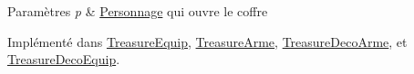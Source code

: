 \begin{DoxyParams}{Paramètres}
{\em p} & \hyperlink{class_personnage}{Personnage} qui ouvre le coffre \\
\hline
\end{DoxyParams}


Implémenté dans \hyperlink{class_treasure_equip_a187762eb0e25641cde7a2b15d94af4ed}{Treasure\-Equip}, \hyperlink{class_treasure_arme_a67423f71b0680eb22913f014e717cb00}{Treasure\-Arme}, \hyperlink{class_treasure_deco_arme_a31ce1bb2064d0bc9318b8b5f21b22a46}{Treasure\-Deco\-Arme}, et \hyperlink{class_treasure_deco_equip_a9b1481b5456bcdbd7d4f9a4bb03c1c25}{Treasure\-Deco\-Equip}.

